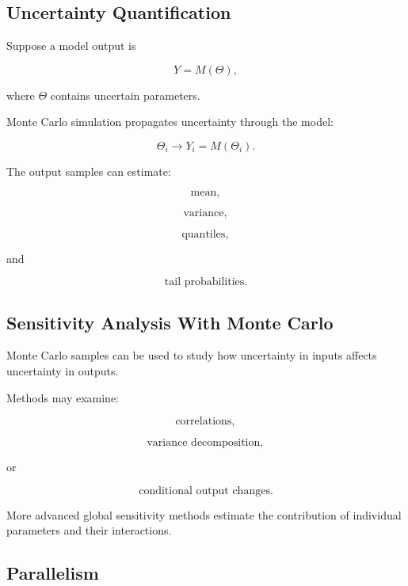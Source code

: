 \subsection{Uncertainty Quantification}
\label{subsec:monte-carlo-uq}

Suppose a model output is

\[
Y
=
M(\Theta),
\]

where \(\Theta\) contains uncertain parameters.

Monte Carlo simulation propagates uncertainty through the model:

\[
\boxed{
\Theta_i
\longrightarrow
Y_i
=
M(\Theta_i).
}
\]

The output samples can estimate:

\[
\boxed{
\text{mean},
}
\]

\[
\boxed{
\text{variance},
}
\]

\[
\boxed{
\text{quantiles},
}
\]

and

\[
\boxed{
\text{tail probabilities}.
}
\]

\subsection{Sensitivity Analysis With Monte Carlo}
\label{subsec:mc-sensitivity-analysis}

Monte Carlo samples can be used to study how uncertainty in inputs affects
uncertainty in outputs.

Methods may examine:

\[
\boxed{
\text{correlations},
}
\]

\[
\boxed{
\text{variance decomposition},
}
\]

or

\[
\boxed{
\text{conditional output changes}.
}
\]

More advanced global sensitivity methods estimate the contribution of
individual parameters and their interactions.

\subsection{Parallelism}
\label{subsec:mc-parallelism}

